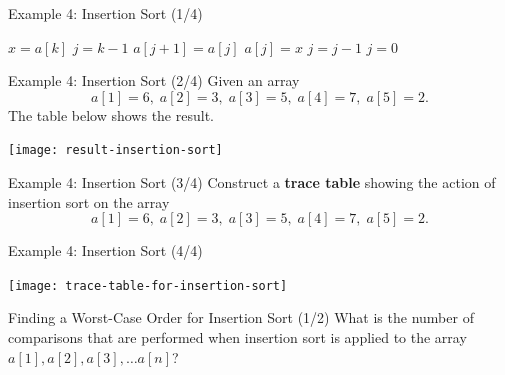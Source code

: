 \documentclass[pdf]{beamer}
\theoremstyle{mystyle}
\begin{document}
\begin{frame}{Example 4: Insertion Sort (1/4)}
		\begin{algorithm}[H]
		\caption{Insertion Sort}
		\label{algo:insertion-sort}
		\begin{algorithmic}[1] 
				\State $x = a[k]$
				\State $j = k-1$
						\State $a[j+1] = a[j]$ 
						\State $a[j] = x$
						\State $j = j - 1$
					\Else
						\State $j=0$				
					\EndIf
				\EndWhile 
			\EndFor
			\EndFunction
		\end{algorithmic}			
	\end{algorithm}	
\end{frame}

\begin{frame}{Example 4: Insertion Sort (2/4)}
	Given an array
	\begin{equation*}
		a[1]=6, \; a[2]=3, \; a[3]=5, \; a[4]=7, \; a[5]=2.
	\end{equation*}
	The table below shows the result.
	\begin{center}
		\texttt{[image: result-insertion-sort]}
	\end{center}
\end{frame}

\begin{frame}{Example 4: Insertion Sort (3/4)}
	Construct a \textbf{trace table} showing the action of insertion sort on the array
	\begin{equation*}
		a[1]=6, \; a[2]=3, \; a[3]=5, \; a[4]=7, \; a[5]=2.
	\end{equation*}	
\end{frame}

\begin{frame}{Example 4: Insertion Sort (4/4)}
	\begin{center}
		\texttt{[image: trace-table-for-insertion-sort]}
	\end{center}
\end{frame}

\begin{frame}{Finding a Worst-Case Order for Insertion Sort (1/2)}
	What is the number of comparisons that are performed when insertion sort is applied to the array $a[1], a[2], a[3], \ldots a[n]$?
\end{frame}
\end{document}
